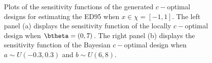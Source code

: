   
  
\begin{figure}[t!]
\centering
{}
\caption{
  Plots of the sensitivity functions of the generated $c-$optimal designs for estimating the ED95 when  $x \in \chi =  [-1, 1]$. The  left panel (a) displays the sensitivity function of the locally  $c-$optimal design when $\btheta = (0, 7)$. The right panel (b) displays the sensitivity function of the  Bayesian $c-$optimal design  when $a\sim U(-0.3, 0.3)$ and $b \sim U(6, 8)$.
}
\label{fig:c-optimal-2pl}
\end{figure}

